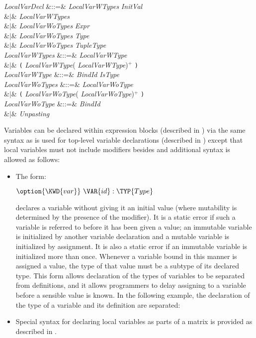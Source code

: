 \begin{Grammar}
\emph{LocalVarDecl}
&::=&  \emph{LocalVarWTypes} \emph{InitVal} \\
&$|$&  \emph{LocalVarWTypes}\\
&$|$& \emph{LocalVarWoTypes} \EXP{=} \emph{Expr} \\
&$|$&  \emph{LocalVarWoTypes} \EXP{\mathrel{\mathtt{:}}} \emph{Type}
 \\
&$|$&  \emph{LocalVarWoTypes} \EXP{\mathrel{\mathtt{:}}} \emph{TupleType}
 \\

\emph{LocalVarWTypes} &::=& \emph{LocalVarWType} \\
&$|$& \texttt{(} \emph{LocalVarWType}(\EXP{,} \emph{LocalVarWType})$^+$ \texttt{)}\\
\emph{LocalVarWType} &::=& \emph{BindId} \emph{IsType}\\

\emph{LocalVarWoTypes} &::=& \emph{LocalVarWoType} \\
&$|$& \texttt{(} \emph{LocalVarWoType}(\EXP{,} \emph{LocalVarWoType})$^+$ \texttt{)}\\
\emph{LocalVarWoType} &::=& \emph{BindId}\\
&$|$& \emph{Unpasting} \\

\end{Grammar}

Variables can be declared within expression blocks (described in
) via the same syntax as is used for top-level
variable declarations (described in ) except that
local variables must not include modifiers besides  and
additional syntax is allowed as follows:
\begin{itemize}
\item
The form:
\begin{Fortress}
\(\option{\KWD{var}}\ \VAR{id} \mathrel{\mathtt{:}} \TYP{Type}\)
\end{Fortress}
declares a variable without giving it an initial value
(where mutability is determined by the presence of the  modifier).
It is a static error if such a variable is referred to before it has been
given a value; an immutable variable is initialized by another variable
declaration and a mutable variable is initialized by assignment.
It is also a static error if an immutable variable is initialized more than once.
Whenever a variable bound in this manner is assigned a value, the type of
that value must be a subtype of its declared type.
This form allows declaration of the types of variables to be separated
from definitions, and it allows programmers to delay assigning to a variable
before a sensible value is known.
In the following example, the declaration of the type of a variable and its
definition are separated:


\item Special syntax for declaring local variables as parts of a
matrix is provided as described in .
\end{itemize}


